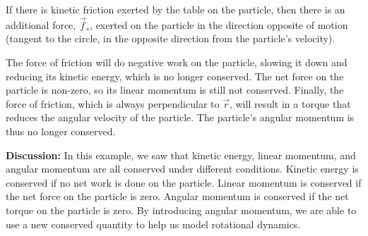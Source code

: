 \begin{example}
If there is kinetic friction exerted by the table on the particle, then there is an additional force, $\vec f_s$, exerted on the particle in the direction opposite of motion (tangent to the circle, in the opposite direction from the particle's velocity). 

The force of friction will do negative work on the particle, slowing it down and reducing its kinetic energy, which is no longer conserved. The net force on the particle is non-zero, so its linear momentum is still not conserved. Finally, the force of friction, which is always perpendicular to $\vec r$, will result in a torque that reduces the angular velocity of the particle. The particle's angular momentum is thus no longer conserved.

\textbf{Discussion: }In this example, we saw that kinetic energy, linear momentum, and angular momentum are all conserved under different conditions. Kinetic energy is conserved if no net work is done on the particle. Linear momentum is conserved if the net force on the particle is zero. Angular momentum is conserved if the net torque on the particle is zero. By introducing angular momentum, we are able to use a new conserved quantity to help us model rotational dynamics.
\end{example} 

